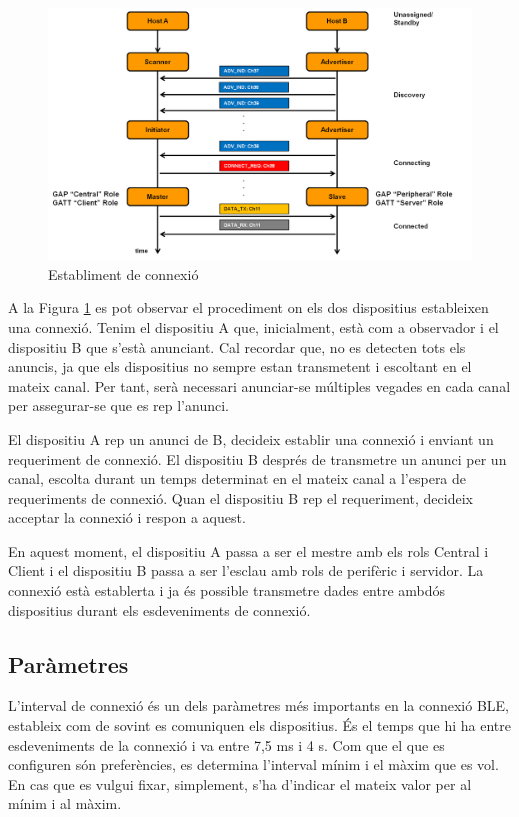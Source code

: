 \begin{figure}[!h]
	\begin{center}
		\includegraphics[width=1\textwidth]{./images/rols_unicast.png}
		\caption{Establiment de connexió \cite{fig:connection_establishement}}
		\label{fig:unicast_roles}
	\end{center}
\end{figure}


A la Figura \ref{fig:unicast_roles} es pot observar el procediment on els dos dispositius estableixen una connexió.
Tenim el dispositiu A que, inicialment, està com a observador i el dispositiu B que s'està anunciant.
Cal recordar que, no es detecten tots els anuncis, ja que els dispositius no sempre estan transmetent i escoltant en el mateix canal.
Per tant, serà necessari anunciar-se múltiples vegades en cada canal per assegurar-se que es rep l'anunci.

El dispositiu A rep un anunci de B, decideix establir una connexió i enviant un requeriment de connexió.
El dispositiu B després de transmetre un anunci per un canal, escolta durant un temps determinat en el mateix canal a l'espera de requeriments de connexió.
Quan el dispositiu B rep el requeriment, decideix acceptar la connexió i respon a aquest.

En aquest moment, el dispositiu A passa a ser el mestre amb els rols Central i Client i el dispositiu B passa a ser l'esclau amb rols de perifèric i servidor.
La connexió està establerta i ja és possible transmetre dades entre ambdós dispositius durant els esdeveniments de connexió. 


\subsection{Paràmetres}
\label{sec:params}
L'interval de connexió és un dels paràmetres més importants en la connexió BLE, estableix com de sovint es comuniquen els dispositius.
És el temps que hi ha entre esdeveniments de la connexió i va entre 7,5 ms i 4 s.
Com que el que es configuren són preferències, es determina l'interval mínim i el màxim que es vol.
En cas que es vulgui fixar, simplement, s'ha d'indicar el mateix valor per al mínim i al màxim.

